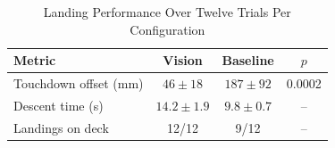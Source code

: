 \begin{table}[!t]
\caption{Landing Performance Over Twelve Trials Per Configuration}
\label{tab:results}
\centering
\small
\setlength{\tabcolsep}{4pt}
\begin{tabular}{lccc}
\toprule
Metric & Vision & Baseline & $p$ \\
\midrule
Touchdown offset (mm)   & $46 \pm 18$    & $187 \pm 92$  & 0.0002 \\
Descent time (s)        & $14.2 \pm 1.9$ & $9.8 \pm 0.7$ & -- \\
Landings on deck        & 12/12          & 9/12          & -- \\
\bottomrule
\end{tabular}
\end{table}
